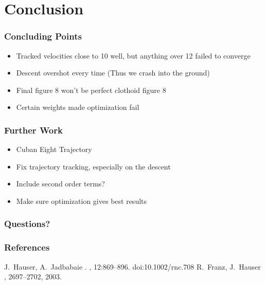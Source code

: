 \documentclass{beamer}
\begin{document}
    \section{Conclusion}
    \begin{frame}
        \frametitle{Concluding Points}
        \begin{itemize}
            \item Tracked velocities close to 10 well, but anything over 12 failed to converge
            \item Descent overshot every time (Thus we crash into the ground)
            \item Final figure 8 won't be perfect clothoid figure 8
            \item Certain weights made optimization fail 
        \end{itemize}
    \end{frame}

    \begin{frame}
        \frametitle{Further Work}
        \begin{itemize}
            \item Cuban Eight Trajectory
            \item Fix trajectory tracking, especially on the descent
            \item Include second order terms?
            \item Make sure optimization gives best results
        \end{itemize}
    \end{frame}

    \begin{frame}
        \frametitle{Questions?}
    \end{frame}

    \begin{frame}[allowframebreaks]
        \frametitle{References}    
        \begin{thebibliography}{10}    
            \beamertemplatearticlebibitems
            J.~Hauser, A.~Jadbabaie
            .
            , 12:869--896. doi:10.1002/rnc.708
            \beamertemplatearticlebibitems
            R.~Franz, J.~Hauser
            , 2697--2702, 2003.
        \end{thebibliography}
    \end{frame} 
\end{document}
